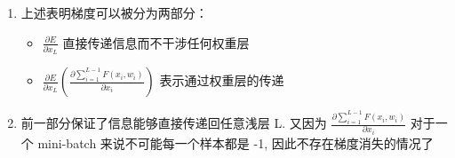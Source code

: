 \documentclass[12pt]{ctexart}%
\begin{document}
\begin{enumerate}
				\item 上述表明梯度可以被分为两部分：
					\begin{itemize}
						\item $\frac{\partial E}{\partial x_L}$ 直接传递信息而不干涉任何权重层
						
						\item $\frac{\partial E}{\partial x_L} \left( \frac{\partial \sum_{i=1}^{L-1} F(x_i, w_i)}{\partial x_i} \right)$ 表示通过权重层的传递 
					\end{itemize}
				
				\item 前一部分保证了信息能够直接传递回任意浅层 L. 又因为 $\frac{\partial \sum_{i=1}^{L-1} F(x_i, w_i)}{\partial x_i}$ 对于一个 mini-batch 来说不可能每一个样本都是 -1, 因此不存在梯度消失的情况了
			\end{enumerate}
						
\end{document}

